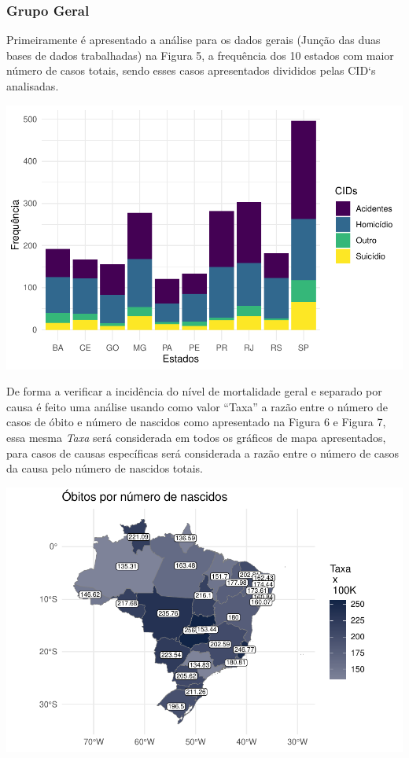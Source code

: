 \documentclass[
]{article}
\let\origfigure\figure
\let\endorigfigure\endfigure
\renewenvironment{figure}[1][2] {
    \expandafter\origfigure\expandafter[H]
} {
    \endorigfigure
}
\begin{document}
\hypertarget{grupo-geral}{%
\subsubsection{Grupo Geral}\label{grupo-geral}}

Primeiramente é apresentado a análise para os dados gerais (Junção das
duas bases de dados trabalhadas) na Figura 5, a frequência dos 10
estados com maior número de casos totais, sendo esses casos apresentados
divididos pelas CID`s analisadas.

\begin{figure}
\centering
\includegraphics{RelatorioV02_files/figure-latex/unnamed-chunk-13-1.pdf}
\caption{Estados por Número de CID`s}
\end{figure}

De forma a verificar a incidência do nível de mortalidade geral e
separado por causa é feito uma análise usando como valor ``Taxa'' a
razão entre o número de casos de óbito e número de nascidos como
apresentado na Figura 6 e Figura 7, essa mesma \emph{Taxa} será
considerada em todos os gráficos de mapa apresentados, para casos de
causas específicas será considerada a razão entre o número de casos da
causa pelo número de nascidos totais.

\begin{figure}
\centering
\includegraphics{RelatorioV02_files/figure-latex/unnamed-chunk-15-1.pdf}
\caption{Dados Gerais}
\end{figure}
\end{document}
